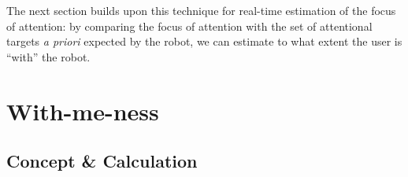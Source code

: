 \documentclass{sig-alternate}
\begin{document}
%
%
%
%
%


The next section builds upon this technique for real-time estimation of
the focus of attention: by comparing the focus of attention with the set of
attentional targets {\it a priori} expected by the robot, we can estimate to
what extent the user is ``with'' the robot.


\section{With-me-ness}
\label{sec:withmeness}

\subsection{Concept \& Calculation}
\end{document}
